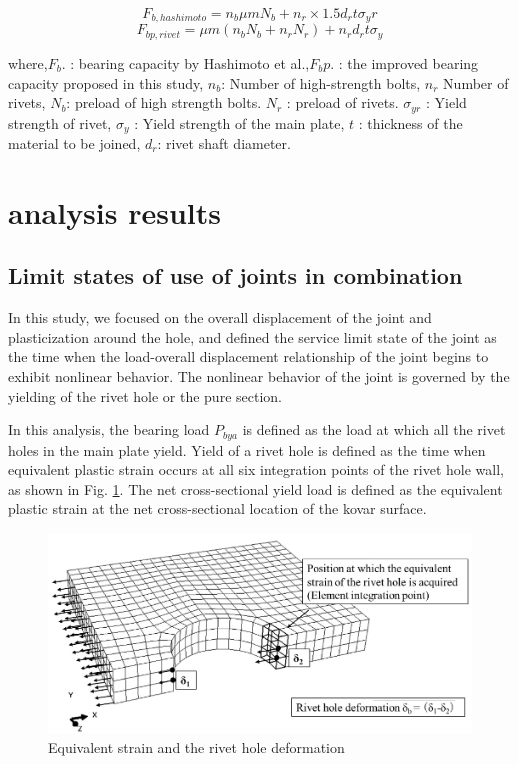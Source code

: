 \begin{equation}\label{eq-fbhashi}
    F_{b,hashimoto}=n_b μmN_b + n_r \times 1.5d_r tσ_yr
\end{equation}
\begin{equation}
    F_{bp,rivet}=μm(n_b N_b+n_r N_r)+n_r d_r tσ_y
\end{equation}

where,$F_b.$ : bearing capacity by Hashimoto et al.,$F_bp$. : the improved bearing capacity proposed in this study, $n_b$: Number of high-strength bolts, $n_r$ Number of rivets, $N_b$: preload of high strength bolts. $N_r$ : preload of rivets. $\sigma_{yr}$ : Yield strength of rivet, $σ_y$ : Yield strength of the main plate, $t$ : thickness of the material to be joined, $d_r$: rivet shaft diameter.


\section{analysis results}

\subsection{Limit states of use of joints in combination}

In this study, we focused on the overall displacement of the joint and plasticization around the hole, and defined the service limit state of the joint as the time when the load-overall displacement relationship of the joint begins to exhibit nonlinear behavior. The nonlinear behavior of the joint is governed by the yielding of the rivet hole or the pure section.

In this analysis, the bearing load $P_{bya}$ is defined as the load at which all the rivet holes in the main plate yield. Yield of a rivet hole is defined as the time when equivalent plastic strain occurs at all six integration points of the rivet hole wall, as shown in Fig. \ref{fig-posieqqe}. The net cross-sectional yield load is defined as the equivalent plastic strain at the net cross-sectional location of the kovar surface.

\begin{figure}
    \centering
    \includegraphics[width=0.75\linewidth]{imgs//ch4/posi-eqqe.pdf}
    \caption{Equivalent strain and the rivet hole deformation}
    \label{fig-posieqqe}
\end{figure}

